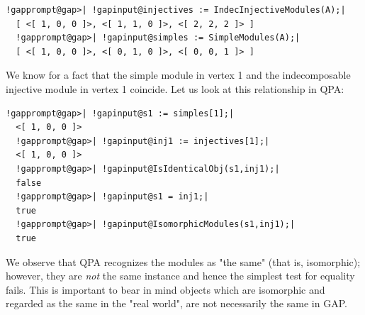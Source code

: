 \documentclass[a4paper,11pt]{report}
\begin{document}
{{\begin{Verbatim}[commandchars=!@|,fontsize=\small,frame=single,label=Example]
  !gapprompt@gap>| !gapinput@injectives := IndecInjectiveModules(A);|
  [ <[ 1, 0, 0 ]>, <[ 1, 1, 0 ]>, <[ 2, 2, 2 ]> ]
  !gapprompt@gap>| !gapinput@simples := SimpleModules(A);|
  [ <[ 1, 0, 0 ]>, <[ 0, 1, 0 ]>, <[ 0, 0, 1 ]> ]
\end{Verbatim}
 We know for a fact that the simple module in vertex 1 and the indecomposable
injective module in vertex 1 coincide. Let us look at this relationship in \textsf{QPA}: 
\begin{Verbatim}[commandchars=!@|,fontsize=\small,frame=single,label=Example]
  !gapprompt@gap>| !gapinput@s1 := simples[1];|
  <[ 1, 0, 0 ]>
  !gapprompt@gap>| !gapinput@inj1 := injectives[1];|
  <[ 1, 0, 0 ]>
  !gapprompt@gap>| !gapinput@IsIdenticalObj(s1,inj1);|
  false
  !gapprompt@gap>| !gapinput@s1 = inj1;|
  true
  !gapprompt@gap>| !gapinput@IsomorphicModules(s1,inj1);|
  true
\end{Verbatim}
 We observe that \textsf{QPA} recognizes the modules as "the same" (that is, isomorphic); however, they are \emph{not} the same instance and hence the simplest test for equality fails. This is
important to bear in mind \texttt{}\texttt{} objects
which are isomorphic and regarded as the same in the "real world", are not
necessarily the same in \textsf{GAP}. }

 
}
\end{document}
